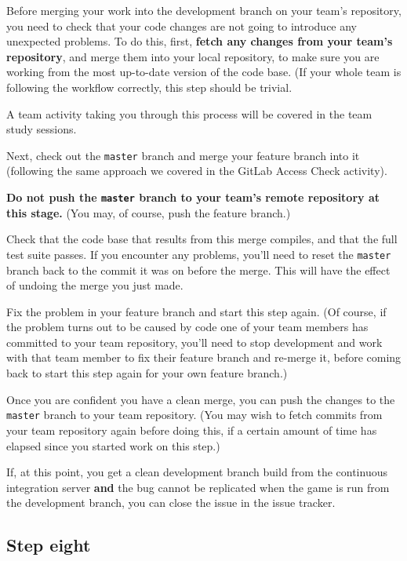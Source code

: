 \documentclass[
]{book}
\begin{document}
Before merging your work into the development branch on your team's repository, you need to check that your code changes are not going to introduce any unexpected problems. To do this, first, \textbf{fetch any changes from your team's repository}, and merge them into your local repository, to make sure you are working from the most up-to-date version of the code base. (If your whole team is following the workflow correctly, this step should be trivial.

A team activity taking you through this process will be covered in the team study sessions.

Next, check out the \texttt{master} branch and merge your feature branch into it (following the same approach we covered in the GitLab Access Check activity).

\textbf{Do not push the \texttt{master} branch to your team's remote repository at this stage.} (You may, of course, push the feature branch.)

Check that the code base that results from this merge compiles, and that the full test suite passes. If you encounter any problems, you'll need to reset the \texttt{master} branch back to the commit it was on before the merge. This will have the effect of undoing the merge you just made.

Fix the problem in your feature branch and start this step again. (Of course, if the problem turns out to be caused by code one of your team members has committed to your team repository, you'll need to stop development and work with that team member to fix their feature branch and re-merge it, before coming back to start this step again for your own feature branch.)

Once you are confident you have a clean merge, you can push the changes to the \texttt{master} branch to your team repository. (You may wish to fetch commits from your team repository again before doing this, if a certain amount of time has elapsed since you started work on this step.)

If, at this point, you get a clean development branch build from the continuous integration server \textbf{and} the bug cannot be replicated when the game is run from the development branch, you can close the issue in the issue tracker.

\hypertarget{stepeight}{%
\subsection{Step eight}\label{stepeight}}
\end{document}
